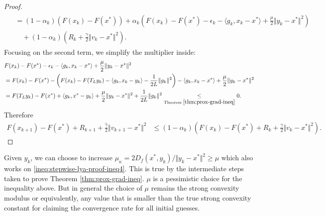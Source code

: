 \documentclass[12pt]{article}
\begin{document}
\begin{proof}
\begin{align}
\begin{split}
                &= (1 - \alpha_k)(F(x_k) - F(x^*))
                + \alpha_k\left(
                    F(x_k) - F(x^*) - \epsilon_k - \langle g_k, x_k - x^*\rangle + \frac{\mu}{2}\Vert y_k - x^*\Vert^2
                \right)
                \\ &\quad 
                    + 
                    (1 - \alpha_k)\left(
                        R_k + \frac{\gamma}{2}\Vert v_k - x^*\Vert^2
                    \right).     
            \end{split}
        \end{align}
        Focusing on the second term, we simplify the multiplier inside: 
        {\small
        \begin{align}\label{ineq:stepwise-lya-proof-ineq4}
        \begin{split}
            & F(x_k) - F(x^*) - \epsilon_k - \langle g_k, x_k - x^*\rangle + \frac{\mu}{2}\Vert y_k - x^*\Vert^2
            \\
            &= 
            F(x_k) - F(x^*) - \left(
                F(x_k) - F(T_L y_k) - \langle g_k, x_k - y_k\rangle - \frac{1}{2L}\Vert g_k\Vert^2
            \right)- \langle g_k, x_k - x^*\rangle + \frac{\mu}{2}\Vert y_k - x^*\Vert^2
            \\
            &= F(T_L y_k) - F(x^*) + \langle g_k, x^* - y_k\rangle + \frac{\mu}{2}\Vert y_k - x^*\Vert^2
            + \frac{1}{2L}\Vert g_k\Vert^2 \underset{\text{Theorem }\ref{thm:prox-grad-ineq}}{\le} 0.     
        \end{split}
        \end{align}
        }
        Therefore
        {\small
        \begin{align*}
            F(x_{k + 1}) - F(x^*) + R_{k + 1} + 
            \frac{\hat \gamma}{2}\Vert v_{k + 1} - x^*\Vert^2
            &\le 
            (1 - \alpha_k)\left(
                F(x_k) - F(x^*) + R_k + \frac{\gamma}{2}\Vert v_k - x^*\Vert^2
            \right). 
        \end{align*}
        }
    \end{proof}
    \begin{remark}
        Given $y_k$, we can choose to increase $\mu_\kappa = 2D_f(x^*, y_k)/\Vert y_k - x^*\Vert^2 \ge \mu$ which also works on \eqref{ineq:stepwise-lya-proof-ineq4}.
        This is true by the intermediate steps taken to prove Theorem \ref{thm:prox-grad-ineq}. 
        $\mu$ is a pessimistic choice for the inequality above. 
        But in general the choice of $\mu$ remains the strong convexity modulus or equivalently, any value that is smaller than the true strong convexity constant for claiming the convergence rate for all initial guesses. 
    \end{remark}
\end{document}
